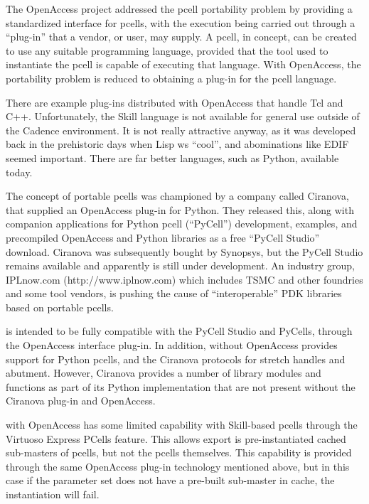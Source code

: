 The OpenAccess project addressed the pcell portability problem by
providing a standardized interface for pcells, with the execution
being carried out through a ``plug-in'' that a vendor, or user, may
supply.  A pcell, in concept, can be created to use any suitable
programming language, provided that the tool used to instantiate the
pcell is capable of executing that language.  With OpenAccess, the
portability problem is reduced to obtaining a plug-in for the pcell
language.

There are example plug-ins distributed with OpenAccess that handle Tcl
and C++.  Unfortunately, the Skill language is not available for
general use outside of the Cadence environment.  It is not really
attractive anyway, as it was developed back in the prehistoric days
when Lisp ws ``cool'', and abominations like EDIF seemed important. 
There are far better languages, such as Python, available today.

The concept of portable pcells was championed by a company called
Ciranova, that supplied an OpenAccess plug-in for Python.  They
released this, along with companion applications for Python pcell
(``PyCell'') development, examples, and precompiled OpenAccess and
Python libraries as a free ``PyCell Studio'' download.  Ciranova was
subsequently bought by Synopsys, but the PyCell Studio remains
available and apparently is still under development.  An industry
group, IPLnow.com ({\vt http://www.iplnow.com}) which includes TSMC
and other foundries and some tool vendors, is pushing the cause of
``interoperable'' PDK libraries based on portable pcells.

\ifoa
{\Xic} is intended to be fully compatible with the PyCell Studio and
PyCells, through the OpenAccess interface plug-in.  In addition,
{\Xic} without OpenAccess provides support for Python pcells, and the
Ciranova protocols for stretch handles and abutment.  However,
Ciranova provides a number of library modules and functions as part of
its Python implementation that are not present without the Ciranova
plug-in and OpenAccess.

{\Xic} with OpenAccess has some limited capability with Skill-based
pcells through the Virtuoso Express PCells feature.  This allows
export is pre-instantiated cached sub-masters of pcells, but not the
pcells themselves.  This capability is provided through the same
OpenAccess plug-in technology mentioned above, but in this case if the
parameter set does not have a pre-built sub-master in cache, the
instantiation will fail.

